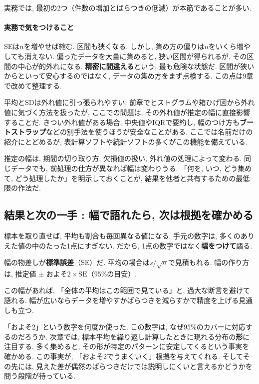     実務では, 最初の2つ（件数の増加とばらつきの低減）が本筋であることが多い.

    \paragraph{実務で気をつけること}

    SEは$n$を増やせば縮む.
    区間も狭くなる.
    しかし, 集め方の偏りは$n$をいくら増やしても消えない.
    偏ったデータを大量に集めると, 狭い区間が得られるが,
    その区間の中心が的外れになる.
    \textbf{精密に間違える}という, 最も危険な状態だ.
    区間が狭いからといって安心するのではなく, データの集め方をまず点検する.
    この点は9章で改めて整理する.

    平均とSDは外れ値に引っ張られやすい.
    前章でヒストグラムや箱ひげ図から外れ値に気づく方法を扱ったが,
    ここでの問題は, その外れ値が推定の幅に直接影響することだ.
    きつい外れ値がある場合, 中央値やIQRで要約し,
    幅のつけ方も\textbf{ブートストラップ}などの別手法を使うほうが安全なことがある.
    ここでは名前だけの紹介にとどめるが,
    表計算ソフトや統計ソフトの多くがこの機能を備えている.

    推定の幅は, 期間の切り取り方, 欠損値の扱い, 外れ値の処理によって変わる.
    同じデータでも, 前処理の仕方が異なれば幅は変わりうる.
    「何を, いつ, どう集めて, どう処理したか」を明示しておくことが,
    結果を他者と共有するための最低限の作法だ.


  \subsection{結果と次の一手 : 幅で語れたら, 次は根拠を確かめる}

    標本を取り直せば, 平均も割合も毎回異なる値になる.
    手元の数字は, 多くのありえた値の中のたった1点にすぎない.
    だから, 1点の数字ではなく\textbf{幅をつけて}語る.

    幅の物差しが\textbf{標準誤差}（SE）だ.
    平均の場合は$s/\sqrt{n}$で見積もれる.
    幅の作り方は, 推定値 $\pm$ およそ$2 \times \mathrm{SE}$（95\%の目安）.

    この幅があれば,
    「全体の平均はこの範囲で見ている」と,
    過大な断言を避けて語れる.
    幅が広いならデータを増やすかばらつきを減らすかで精度を上げる見通しも立つ.

    「およそ2」という数字を何度か使った.
    この数字は, なぜ95\%のカバーに対応するのだろうか.
    次章では, 標本平均を繰り返し計算したときに現れる分布の\textbf{形}に注目する.
    多く集めると, その形が特定のパターンに安定してくるという事実を確かめる.
    この事実が, 「およそ2でうまくいく」根拠を与えてくれる.
    そしてその先には, 見えた差が偶然のばらつきだけでは説明しにくいと言えるかどうかを問う段階が待っている.


